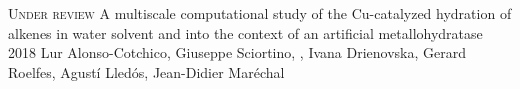 \begin{cventries}
  \pubentry
    {\scshape{Under review}} %
    {A multiscale computational study of the Cu-catalyzed hydration of alkenes in water solvent and into the context of an artificial metallohydratase} %
    {2018} %
    {} %
    {Lur Alonso-Cotchico, Giuseppe Sciortino, , Ivana Drienovska, Gerard Roelfes, Agustí Lledós, Jean-Didier Maréchal} %
    {} %
    {} %



\end{cventries}


